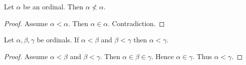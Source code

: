\documentclass[10pt]{article}
\begin{document}
  \begin{forthel}
    \begin{proposition}
      Let $\alpha$ be an ordinal.
      Then $\alpha \nless \alpha$.
    \end{proposition}
    \begin{proof}
      Assume $\alpha < \alpha$.
      Then $\alpha \in \alpha$.
      Contradiction.
    \end{proof}
  \end{forthel}

  \begin{forthel}
    \begin{proposition}
      Let $\alpha, \beta, \gamma$ be ordinals.
      If $\alpha < \beta$ and $\beta < \gamma$ then $\alpha < \gamma$.
    \end{proposition}
    \begin{proof}
      Assume $\alpha < \beta$ and $\beta < \gamma$.
      Then $\alpha \in \beta \in \gamma$.
      Hence $\alpha \in \gamma$.
      Thus $\alpha < \gamma$.
    \end{proof}
  \end{forthel}
\end{document}
